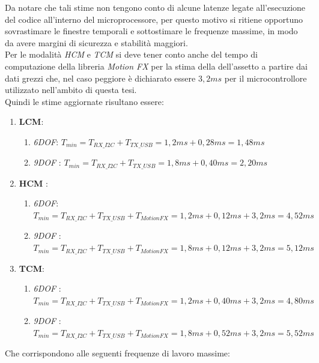  Da notare che tali stime non tengono conto di alcune latenze legate all'esecuzione del codice all'interno del microprocessore, per questo motivo si ritiene opportuno sovrastimare le finestre temporali e sottostimare le frequenze massime, in modo da avere margini di sicurezza e stabilità maggiori.\\
Per le modalità \textit{HCM} e \textit{TCM} si deve tener conto anche del tempo di computazione della libreria \textit{Motion FX} per la stima della dell'assetto a partire dai dati grezzi che, nel caso peggiore è dichiarato essere $3,2 ms$ \cite{motion} per il microcontrollore utilizzato nell'ambito di questa tesi.\\
Quindi le stime aggiornate risultano essere:
\begin{enumerate}
	\item \textbf{LCM}:
	\begin{enumerate}
		\item \textit{6DOF}: $T_{min} = T_{RX\_I2C} + T_{TX\_USB} = 1,2 ms + 0,28 ms = 1,48 ms $
		\item \textit{9DOF} : $ T_{min} = T_{RX\_I2C} + T_{TX\_USB} = 1,8 ms + 0,40 ms = 2,20 ms $
	\end{enumerate}
	\item \textbf{HCM} :
	\begin{enumerate}
		\item \textit{6DOF}: $T_{min} = T_{RX\_I2C} + T_{TX\_USB} + T_{MotionFX}  = 1,2 ms + 0,12 ms + 3,2ms = 4,52 ms $
		\item \textit{9DOF} : $ T_{min} = T_{RX\_I2C} + T_{TX\_USB} + T_{MotionFX} = 1,8 ms + 0,12 ms + 3,2ms = 5,12 ms $
	\end{enumerate}
	\item \textbf{TCM}:
	\begin{enumerate}
		\item \textit{6DOF} : $ T_{min} = T_{RX\_I2C} + T_{TX\_USB} + T_{MotionFX} = 1,2 ms + 0,40 ms + 3,2ms = 4,80 ms $
		\item \textit{9DOF} : $T_{min} = T_{RX\_I2C} + T_{TX\_USB} + T_{MotionFX} = 1,8 ms + 0,52 ms + 3,2 ms = 5,52 ms $
	\end{enumerate}
\end{enumerate}

 
Che corrispondono alle seguenti frequenze di lavoro massime:

